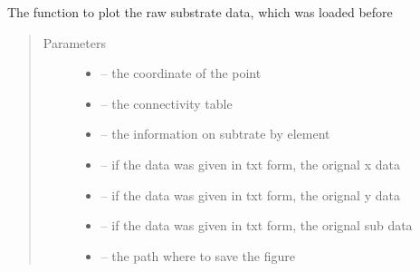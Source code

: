 \documentclass[letterpaper,10pt,english]{sphinxmanual}
\begin{document}
\begin{fulllineitems}
\label{\detokenize{index:src.substrate.fig_substrate}}
The function to plot the raw substrate data, which was loaded before
\begin{quote}\begin{description}
\item[{Parameters}] \leavevmode\begin{itemize}
\item {} 
 -- the coordinate of the point

\item {} 
 -- the connectivity table

\item {} 
 -- the information on subtrate by element

\item {} 
 -- if the data was given in txt form, the orignal x data

\item {} 
 -- if the data was given in txt form, the orignal y data

\item {} 
 -- if the data was given in txt form, the orignal sub data

\item {} 
 -- the path where to save the figure

\end{itemize}

\end{description}\end{quote}

\end{fulllineitems}

\end{document}
